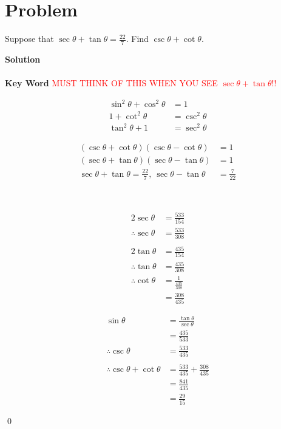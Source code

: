 \documentclass{article}
\newenvironment{solution}{\begin{trivlist}\item[]{\bf Solution}}{\qed \end{trivlist}}
\begin{document}
\section*{Problem}
Suppose that $\sec\theta + \tan\theta = \frac{22}{7}$. Find $\csc\theta + \cot\theta$.
\begin{solution}
\\\\
\textbf{Key Word} \textcolor{red}{MUST THINK OF THIS WHEN YOU SEE $\sec\theta + \tan\theta$!!} \\
\begin{minipage}{0.48\textwidth}
\begin{align*}
    \sin^2\theta + \cos^2\theta &= 1 \\
    1 + \cot^2\theta &= \csc^2\theta \\
    \tan^2\theta + 1 &= \sec^2\theta
\end{align*}
\end{minipage}
\begin{minipage}{0.48\textwidth}
\begin{align*}
    (\csc\theta + \cot\theta)(\csc\theta - \cot\theta) &= 1 \\
    (\sec\theta + \tan\theta)(\sec\theta - \tan\theta) &= 1 \\
    \sec\theta + \tan\theta = \frac{22}{7},\ \sec\theta - \tan\theta &= \frac{7}{22}
\end{align*}
\end{minipage} \\
\begin{minipage}{0.48\textwidth}
\begin{align*}
    2\sec\theta &= \frac{533}{154} \\
    \therefore \sec\theta &= \frac{533}{308}
    \\\\
    2\tan\theta &= \frac{435}{154} \\
    \therefore \tan\theta &= \frac{435}{308} \\
    \therefore \cot\theta &= \frac{1}{\frac{435}{308}}  \\
    &= \frac{308}{435}
\end{align*}
\end{minipage}
\begin{minipage}{0.48\textwidth}
\begin{align*}
    \sin\theta
    &= \frac{\tan\theta}{\sec\theta} \\
    &= \frac{435}{533} \\
    \therefore \csc\theta &= \frac{533}{435}
    \\\\
    \therefore \csc\theta + \cot\theta
    &= \frac{533}{435} + \frac{308}{435} \\
    &= \frac{841}{435} \\
    &= \boxed{\frac{29}{15}}
\end{align*}
\end{minipage}

\end{solution}
\end{document}
